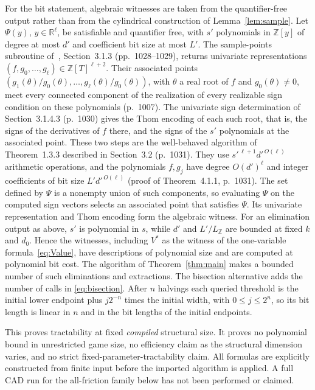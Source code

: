 \documentclass[11pt,a4paper]{article}
\numberwithin{equation}{section}
\theoremstyle{definition}
\newcommand{\R}{\mathbb R}
\begin{document}
For the bit statement, algebraic witnesses are taken from the
quantifier-free output rather than from the cylindrical construction of
Lemma~\ref{lem:sample}. Let \(\Psi(y)\), \(y\in\R^\ell\), be satisfiable
and quantifier free, with \(s'\) polynomials in \(\mathbb Z[y]\) of degree
at most \(d'\) and coefficient bit size at most \(L'\).
The sample-points subroutine of~\cite{BPR1996}, Section~3.1.3
(pp.~1028--1029), returns univariate representations
\((f,g_0,\dots,g_\ell)\in\mathbb Z[T]^{\ell+2}\). Their associated points
\((g_1(\theta)/g_0(\theta),\dots,g_\ell(\theta)/g_0(\theta))\), with
\(\theta\) a real root of \(f\) and \(g_0(\theta)\ne0\), meet every
connected component of the realization of every realizable sign
condition on these polynomials (p.~1007).
The univariate sign determination of Section~3.1.4.3 (p.~1030) gives the
Thom encoding of each such root, that is, the signs of the derivatives
of \(f\) there, and the signs of the \(s'\) polynomials at the associated
point. These two steps are the well-behaved algorithm of
Theorem~1.3.3 described in Section~3.2 (p.~1031). They use
\(s'^{\,\ell+1}d'^{\,O(\ell)}\) arithmetic operations, and the polynomials
\(f,g_j\) have degree \(O(d')^\ell\) and integer coefficients of bit size
\(L'd'^{\,O(\ell)}\) (proof of Theorem~4.1.1, p.~1031).
The set defined by \(\Psi\) is a nonempty union of such components, so
evaluating \(\Psi\) on the computed sign vectors selects an associated
point that satisfies \(\Psi\). Its univariate representation and Thom
encoding form the algebraic witness.
For an elimination output as above, \(s'\) is polynomial in \(s\), while
\(d'\) and \(L'/L_{\mathbb Z}\) are bounded at fixed \(k\) and \(d_0\).
Hence the witnesses, including \(V^*\) as the witness of the
one-variable formula~\eqref{eq:Value}, have descriptions of polynomial
size and are computed at polynomial bit cost.
The algorithm of Theorem~\ref{thm:main} makes a bounded number of such
eliminations and extractions.
The bisection alternative adds the number of calls in
\eqref{eq:bisection}. After \(n\) halvings each queried threshold is the
initial lower endpoint plus \(j2^{-n}\) times the initial width, with
\(0\le j\le2^n\), so its bit length is linear in \(n\) and in the bit
lengths of the initial endpoints.

This proves tractability at fixed \emph{compiled} structural size.
It proves no polynomial bound in unrestricted game size, no efficiency
claim as the structural dimension varies, and no strict
fixed-parameter-tractability claim.
All formulas are explicitly constructed from finite input before the
imported algorithm is applied.
A full CAD run for the all-friction family below has not been performed
or claimed.
\end{document}
